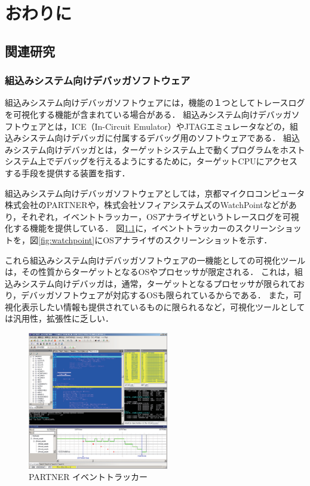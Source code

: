 \chapter{おわりに}
\section{関連研究}
\subsection*{組込みシステム向けデバッガソフトウェア}
組込みシステム向けデバッガソフトウェアには，機能の１つとしてトレースログを可視化する機能が含まれている場合がある．
組込みシステム向けデバッガソフトウェアとは，ICE（In-Circuit Emulator）やJTAGエミュレータなどの，組込みシステム向けデバッガに付属するデバッグ用のソフトウェアである．
組込みシステム向けデバッガとは，ターゲットシステム上で動くプログラムをホストシステム上でデバッグを行えるようにするために，ターゲットCPUにアクセスする手段を提供する装置を指す．

組込みシステム向けデバッガソフトウェアとしては，京都マイクロコンピュータ株式会社のPARTNER\cite{PARTNER-JET}や，株式会社ソフィアシステムズのWatchPoint\cite{watchpoint}などがあり，それぞれ，イベントトラッカー，OSアナライザというトレースログを可視化する機能を提供している．
図\ref{fig:PARTNER-JET}に，イベントトラッカーのスクリーンショットを，図\ref{fig:watchpoint}にOSアナライザのスクリーンショットを示す．

これら組込みシステム向けデバッガソフトウェアの一機能としての可視化ツールは，その性質からターゲットとなるOSやプロセッサが限定される．
これは，組込みシステム向けデバッガは，通常，ターゲットとなるプロセッサが限られており，デバッガソフトウェアが対応するOSも限られているからである．
また，可視化表示したい情報も提供されているものに限られるなど，可視化ツールとしては汎用性，拡張性に乏しい．

\begin{figure}
\begin{center}
\includegraphics[height=6cm]{PARTNER-JET.eps}
\caption{PARTNER イベントトラッカー}
\label{fig:PARTNER-JET}
\end{center}
\end{figure}

